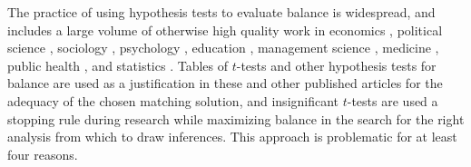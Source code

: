 \documentclass[11pt,titlepage]{article}
\begin{document}
The practice of using hypothesis tests to evaluate balance is
widespread, and includes a large volume of otherwise high quality work
in economics \citep{MilFreMcH03,BlaSmi04,AgoDyn04,DehWah99,
  DehWah02,SmiTod05}, political science \citep{Imai05,SimHop05,
  Lassen05}, sociology \citep{Harding03,DiPGan04,LunSmi05}, psychology
\citep{HavNag05,HilWalBro05,YosMagBos03,JonDAgGon04,McCRidMor04},
education \citep{Crosnoe05,SchBuc03}, management science
\citep{FreMil04, Villalonga04,WanSchAvo05}, medicine
\citep{WanSchAvo05, MacRivJur06,LinPekWan06,ManTudDie06, PetRoeMul06,
  ShiLitPot06,SabCanGib05,PerUndZho00,AusMam06,AusMamStu05}, public
health \citep{NovReaRau06,ElBGilWu05,LauSmiSta00,BinBreEar05}, and
statistics \citep{LuZanHor01}.  Tables of $t$-tests and other
hypothesis tests for balance are used as a justification in these and
other published articles for the adequacy of the chosen matching
solution, and insignificant $t$-tests are used a stopping rule during
research while maximizing balance in the search for the right analysis
from which to draw inferences.  This approach is problematic for at
least four reasons.
\end{document}
